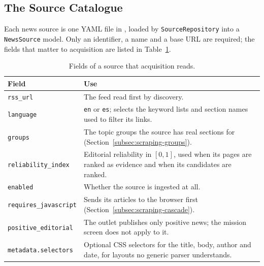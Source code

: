 
\subsection{The Source Catalogue}
\label{subsec:scraping-sources}

Each news source is one YAML file in ,
loaded by \texttt{SourceRepository} into a \texttt{NewsSource} model.
Only an identifier, a name and a base URL are required; the fields
that matter to acquisition are listed in
Table~\ref{tab:source-fields}.

\begin{table}[ht]
\centering
\small
\caption{Fields of a source that acquisition reads.}
\label{tab:source-fields}
\begin{tabularx}{\linewidth}{@{}lX@{}}
\toprule
Field & Use \\
\midrule
\texttt{rss\_url}             & The feed read first by discovery. \\
\texttt{language}             & \texttt{en} or \texttt{es}; selects the
                                 keyword lists and section names used to
                                 filter its links. \\
\texttt{groups}               & The topic groups the source has real
                                 sections for
                                 (Section~\ref{subsec:scraping-groups}). \\
\texttt{reliability\_index}   & Editorial reliability in $[0,1]$, used
                                 when its pages are ranked as evidence
                                 and when its candidates are ranked. \\
\texttt{enabled}              & Whether the source is ingested at all. \\
\texttt{requires\_javascript} & Sends its articles to the browser first
                                 (Section~\ref{subsec:scraping-cascade}). \\
\texttt{positive\_editorial}  & The outlet publishes only positive news;
                                 the mission screen does not apply to it. \\
\texttt{metadata.selectors}   & Optional CSS selectors for the title,
                                 body, author and date, for layouts no
                                 generic parser understands. \\
\bottomrule
\end{tabularx}
\end{table}


